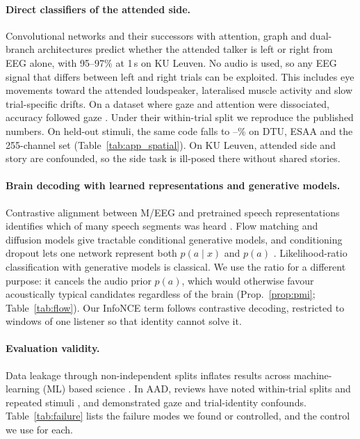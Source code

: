 \documentclass[10pt,twocolumn,letterpaper]{article}
\begin{document}
\paragraph{Direct classifiers of the attended side.} Convolutional networks
\citep{vandecappelle2021eeg} and their successors with attention, graph and dual-branch
architectures \citep{darnet2024,dbpnet2024,listennet2025} predict whether the attended
talker is left or right from EEG alone, with 95--97\% at 1\,s on KU Leuven. No audio is
used, so any EEG signal that differs between left and right trials can be exploited. This
includes eye movements toward the attended loudspeaker, lateralised muscle activity and
slow trial-specific drifts. On a dataset where gaze and attention were dissociated,
accuracy followed gaze \citep{rotaru2024what}. Under their within-trial split we reproduce
the published numbers. On held-out stimuli, the same code falls to \spAmin--\spAmax\% on
DTU, ESAA and the 255-channel set (Table~\ref{tab:app_spatial}). On KU Leuven, attended
side and story are confounded, so the side task is ill-posed there without shared
stories.

\paragraph{Brain decoding with learned representations and generative models.}
Contrastive alignment between M/EEG and pretrained speech representations identifies
which of many speech segments was heard \citep{defossez2023decoding}. Flow matching
\citep{lipman2023flow} and diffusion models give tractable conditional generative models,
and conditioning dropout lets one network represent both $p(a\mid x)$ and $p(a)$
\citep{ho2022classifierfree}. Likelihood-ratio classification with generative models is
classical. We use the ratio for a different purpose: it cancels the audio prior $p(a)$,
which would otherwise favour acoustically typical candidates regardless of the brain
(Prop.~\ref{prop:pmi}; Table~\ref{tab:flow}). Our InfoNCE term follows contrastive
decoding, restricted to windows of one listener so that identity cannot solve it.

\paragraph{Evaluation validity.} Data leakage through non-independent splits inflates
results across machine-learning (ML) based science \citep{kapoor2023leakage}. In AAD, reviews have noted
within-trial splits and repeated stimuli \citep{puffay2023relating}, and
\citet{rotaru2024what} demonstrated gaze and trial-identity confounds. Table~\ref{tab:failure}
lists the failure modes we found or controlled, and the control we use for each.
\end{document}
